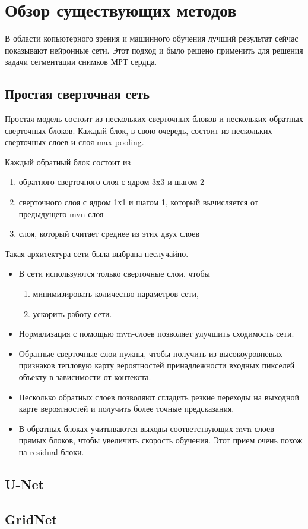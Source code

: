 \section{Обзор существующих методов}

В области копьютерного зрения и машинного обучения лучший результат сейчас показывают нейронные сети. Этот подход и было решено применить для решения задачи сегментации снимков МРТ сердца.

\subsection{Простая сверточная сеть}
 
Простая модель состоит из нескольких сверточных блоков и нескольких обратных сверточных блоков. Каждый блок, в свою очередь, состоит из нескольких сверточных слоев и слоя max pooling. 

Каждый обратный блок состоит из 

\begin{enumerate}
	\item обратного сверточного слоя с ядром 3x3 и шагом 2
	\item сверточного слоя с ядром 1х1 и шагом 1, который вычисляется от предыдущего mvn-слоя
	\item слоя, который считает среднее из этих двух слоев 
\end{enumerate}

Такая архитектура сети была выбрана неслучайно.

\begin{itemize}
	\item В сети используются только сверточные слои, чтобы
	\begin{enumerate}
		\item минимизировать количество параметров сети,
		\item ускорить работу сети.
	\end{enumerate}
	\item Нормализация с помощью mvn-слоев позволяет улучшить сходимость сети.
	\item Обратные сверточные слои нужны, чтобы получить из высокоуровневых признаков тепловую карту вероятностей принадлежности входных пикселей объекту в зависимости от контекста.
	\item Несколько обратных слоев позволяют сгладить резкие переходы на выходной карте вероятностей и получить более точные предсказания.
	\item В обратных блоках учитываются выходы соответствующих mvn-слоев прямых блоков, чтобы увеличить скорость обучения. Этот прием очень похож на residual блоки.
 \end{itemize}

\subsection{U-Net}

\subsection{GridNet}
